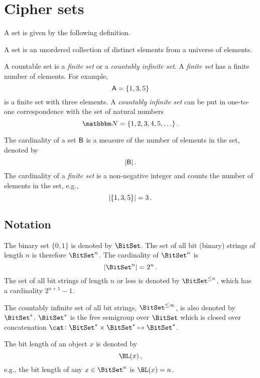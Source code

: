 \documentclass[ ../main.tex]{subfiles}
\begin{document}
\section{Cipher sets}
\label{sec:ob_set_def}
A set is given by the following definition.
\begin{definition}
A set is an unordered collection of distinct elements from a universe of elements.
\end{definition}

A countable set is a \emph{finite set} or a \emph{countably infinite set}. A \emph{finite set} has a finite number of elements. For example,
\[
    \Set{A} = \{ 1, 3, 5 \}
\]
is a finite set with three elements. A \emph{countably infinite set} can be put in one-to-one correspondence with the set of natural numbers
\begin{equation}
    \NatSet = \{1,2,3,4,5,\ldots\}\,.
\end{equation}

The cardinality of a set $\Set{B}$ is a measure of the number of elements in the set, denoted by
\begin{equation}
    \Card{\Set{B}}\,.
\end{equation}
The cardinality of a \emph{finite set} is a non-negative integer and counts the number of elements in the set, e.g.,
\[
    \lvert\left\{ 1, 3, 5\right\}\rvert = 3\,.
\]

\subsection{Notation}
The binary set $\{0,1\}$ is denoted by $\BitSet$. The set of all bit (binary) strings of length $n$ is therefore $\BitSet^n$. The cardinality of $\BitSet^n$ is
\begin{equation}
\Card{\BitSet^n} = 2^n\,.
\end{equation}
The set of all bit strings of length $n$ or less is denoted by $\BitSet^{\leq n}$, which has a cardinality $2^{n+1}-1$.

The countably infinite set of all bit strings, $\BitSet^{\leq \infty}$, is also denoted by $\BitSet^*$.
$\BitSet^*$ is the free semigroup over $\BitSet$ which is closed over concatenation $\cat \colon {\BitSet^*} \times {\BitSet^*} \mapsto {\BitSet^*}$.

The bit length of an object $x$ is denoted by
\begin{equation}
\BL(x)\,,
\end{equation}
e.g., the bit length of any $x \in \BitSet^n$ is $\BL(x) = n$.
\end{document}
